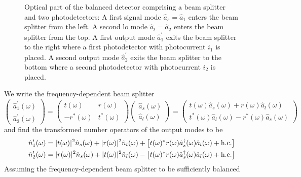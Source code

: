 \begin{figure}[htb]
    \centering
    
    \caption{Optical part of the balanced detector comprising a beam splitter and two photodetectors: A first signal mode $\hat{a}_s=\hat{a}_1$ enters the beam splitter from the left. A second \gls{lo} mode $\hat{a}_l=\hat{a}_2$ enters the beam splitter from the top. A first output mode $\hat{a}_1^\prime$ exits the beam splitter to the right where a first photodetector with photocurrent $i_1$ is placed. A second output mode $\hat{a}_2^\prime$ exits the beam splitter to the bottom where a second photodetector with photocurrent $i_2$ is placed.}\label{fig:balanced_detector_optics}
\end{figure}

We write the frequency-dependent beam splitter \cite[p.~207]{Vogel2006}
\begin{equation}
	\begin{pmatrix}
		\hat{a}_1^\prime(\omega) \\
		\hat{a}_2^\prime(\omega)
	\end{pmatrix}
	=
	\begin{pmatrix}
		t(\omega) & r(\omega) \\
		-r^*(\omega) & t^*(\omega)
	\end{pmatrix}
	\begin{pmatrix}
		\hat{a}_s(\omega) \\
		\hat{a}_l(\omega)
	\end{pmatrix}
	=
	\begin{pmatrix}
		t(\omega)\hat{a}_s(\omega) + r(\omega)\hat{a}_l(\omega) \\
		t^*(\omega)\hat{a}_l(\omega) - r^*(\omega)\hat{a}_s(\omega)
	\end{pmatrix}
\end{equation}
and find the transformed number operators of the output modes to be
\begin{align}
	\hat{n}_1^\prime(\omega)
	&=
	\lvert t(\omega)\rvert^2
	\hat{n}_s(\omega)
	+
	\lvert r(\omega)\rvert^2
	\hat{n}_l(\omega)
	+
	\left[
		t(\omega)^*
		r(\omega)
		\hat{a}_s^\dagger(\omega)
		\hat{a}_l(\omega)
		+
		\text{h.c.}
	\right]
	\\
	\hat{n}_2^\prime(\omega)
	&=
	\lvert r(\omega)\rvert^2
	\hat{n}_s(\omega)
	+
	\lvert t(\omega)\rvert^2
	\hat{n}_l(\omega)
	-
	\left[
		t(\omega)^*
		r(\omega)
		\hat{a}_s^\dagger(\omega)
		\hat{a}_l(\omega)
		+
		\text{h.c.}
	\right]
\end{align}
Assuming the frequency-dependent beam splitter to be sufficiently balanced
